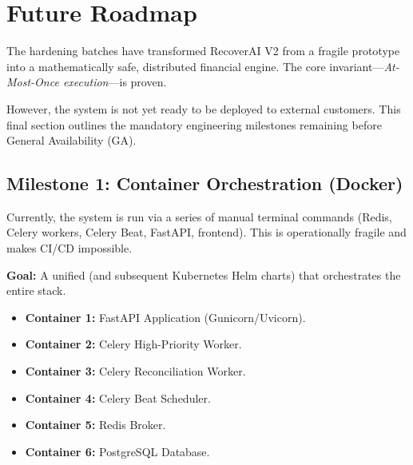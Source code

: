 
\section{Future Roadmap}

\begin{tcolorbox}[summarybox={\iconBulb[1.5] The Path to Production}]
\color{textdark}
The hardening batches have transformed RecoverAI V2 from a fragile prototype into a mathematically safe, distributed financial engine. The core invariant—\textit{At-Most-Once execution}—is proven.

However, the system is not yet ready to be deployed to external customers. This final section outlines the mandatory engineering milestones remaining before General Availability (GA).
\end{tcolorbox}

\vspace{0.8cm}

\subsection{Milestone 1: Container Orchestration (Docker)}

Currently, the system is run via a series of manual terminal commands (Redis, Celery workers, Celery Beat, FastAPI, frontend). This is operationally fragile and makes CI/CD impossible.

\begin{tcolorbox}[featurebox={The Dockerization Requirement}]
\textbf{Goal:} A unified  (and subsequent Kubernetes Helm charts) that orchestrates the entire stack.
\begin{itemize}
    \item \textbf{Container 1:} FastAPI Application (Gunicorn/Uvicorn).
    \item \textbf{Container 2:} Celery High-Priority Worker.
    \item \textbf{Container 3:} Celery Reconciliation Worker.
    \item \textbf{Container 4:} Celery Beat Scheduler.
    \item \textbf{Container 5:} Redis Broker.
    \item \textbf{Container 6:} PostgreSQL Database.
\end{itemize}
\end{tcolorbox}


